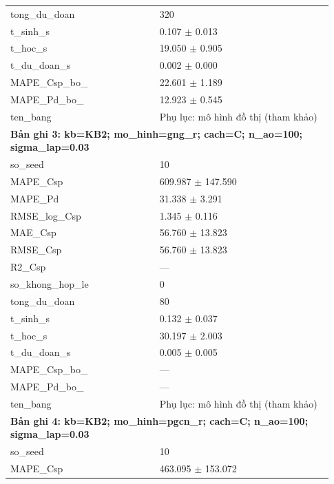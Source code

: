 \begin{longtable}{p{0.43\linewidth}p{0.50\linewidth}}
tong\_\allowbreak du\_\allowbreak doan & 320 \\
t\_\allowbreak sinh\_\allowbreak s & 0.107 $\pm$ 0.013 \\
t\_\allowbreak hoc\_\allowbreak s & 19.050 $\pm$ 0.905 \\
t\_\allowbreak du\_\allowbreak doan\_\allowbreak s & 0.002 $\pm$ 0.000 \\
MAPE\_\allowbreak Csp\_\allowbreak bo\_\allowbreak 0075 & 22.601 $\pm$ 1.189 \\
MAPE\_\allowbreak Pd\_\allowbreak bo\_\allowbreak 0075 & 12.923 $\pm$ 0.545 \\
ten\_\allowbreak bang & Phụ lục: mô hình đồ thị (tham khảo) \\
\midrule
\multicolumn{2}{p{0.95\linewidth}}{\textbf{Bản ghi 3: kb=KB2; mo\_hinh=gng\_r; cach=C; n\_ao=100; sigma\_lap=0.03}} \\
so\_\allowbreak seed & 10 \\
MAPE\_\allowbreak Csp & 609.987 $\pm$ 147.590 \\
MAPE\_\allowbreak Pd & 31.338 $\pm$ 3.291 \\
RMSE\_\allowbreak log\_\allowbreak Csp & 1.345 $\pm$ 0.116 \\
MAE\_\allowbreak Csp & 56.760 $\pm$ 13.823 \\
RMSE\_\allowbreak Csp & 56.760 $\pm$ 13.823 \\
R2\_\allowbreak Csp & — \\
so\_\allowbreak khong\_\allowbreak hop\_\allowbreak le & 0 \\
tong\_\allowbreak du\_\allowbreak doan & 80 \\
t\_\allowbreak sinh\_\allowbreak s & 0.132 $\pm$ 0.037 \\
t\_\allowbreak hoc\_\allowbreak s & 30.197 $\pm$ 2.003 \\
t\_\allowbreak du\_\allowbreak doan\_\allowbreak s & 0.005 $\pm$ 0.005 \\
MAPE\_\allowbreak Csp\_\allowbreak bo\_\allowbreak 0075 & — \\
MAPE\_\allowbreak Pd\_\allowbreak bo\_\allowbreak 0075 & — \\
ten\_\allowbreak bang & Phụ lục: mô hình đồ thị (tham khảo) \\
\midrule
\multicolumn{2}{p{0.95\linewidth}}{\textbf{Bản ghi 4: kb=KB2; mo\_hinh=pgcn\_r; cach=C; n\_ao=100; sigma\_lap=0.03}} \\
so\_\allowbreak seed & 10 \\
MAPE\_\allowbreak Csp & 463.095 $\pm$ 153.072 \\

\end{longtable}
